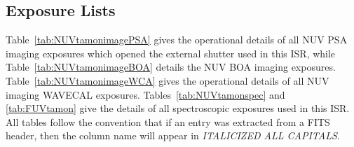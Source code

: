 \clearpage
\subsection{Exposure Lists}\label{subsec:elists}

Table~\ref{tab:NUVtamonimagePSA} gives the operational details of all NUV PSA imaging exposures which opened the
external shutter used in this ISR, while Table~\ref{tab:NUVtamonimageBOA} details the NUV BOA imaging exposures.
Table~\ref{tab:NUVtamonimageWCA} gives the operational details of all NUV imaging WAVECAL exposures.
Tables~\ref{tab:NUVtamonspec} and \ref{tab:FUVtamon} give the details of all spectroscopic exposures used in this ISR.
All tables follow the convention that if an entry was extracted from a FITS header, then the column name will appear in \textit{ITALICIZED ALL CAPITALS}.\\

